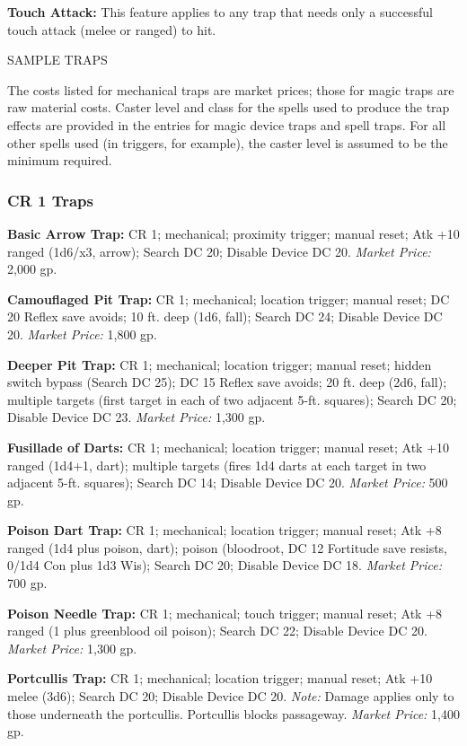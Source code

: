 \documentclass{article}
\begin{document}
\textbf{Touch Attack:} This feature applies to any trap that needs only a successful 
touch attack (melee or ranged) to hit.

\vspace{12pt}
SAMPLE TRAPS

The costs listed for mechanical traps are market prices; those for magic traps 
are raw material costs. Caster level and class for the spells used to produce the 
trap effects are provided in the entries for magic device traps and spell traps. 
For all other spells used (in triggers, for example), the caster level is assumed 
to be the minimum required.

\subsubsection*{\textbf{CR 1 Traps}}

\textbf{Basic Arrow Trap:} CR 1; mechanical; proximity trigger; manual reset; Atk 
+10 ranged (1d6/x3, arrow); Search DC 20; Disable Device DC 20. \textit{Market 
Price: }2,000 gp.

\textbf{Camouflaged Pit Trap:} CR 1; mechanical; location trigger; manual reset; 
DC 20 Reflex save avoids; 10 ft. deep (1d6, fall); Search DC 24; Disable Device 
DC 20. \textit{Market Price: }1,800 gp.

\textbf{Deeper Pit Trap: }CR 1; mechanical; location trigger; manual reset; hidden 
switch bypass (Search DC 25); DC 15 Reflex save avoids; 20 ft. deep (2d6, fall); 
multiple targets (first target in each of two adjacent 5-ft. squares); Search DC 
20; Disable Device DC 23. \textit{Market Price: }1,300 gp.

\textbf{Fusillade of Darts:} CR 1; mechanical; location trigger; manual reset; 
Atk +10 ranged (1d4+1, dart); multiple targets (fires 1d4 darts at each target 
in two adjacent 5-ft. squares); Search DC 14; Disable Device DC 20. \textit{Market 
Price: }500 gp.

\textbf{Poison Dart Trap:} CR 1; mechanical; location trigger; manual reset; Atk 
+8 ranged (1d4 plus poison, dart); poison (bloodroot, DC 12 Fortitude save resists, 
0/1d4 Con plus 1d3 Wis); Search DC 20; Disable Device DC 18. \textit{Market Price: 
}700 gp.

\textbf{Poison Needle Trap:} CR 1; mechanical; touch trigger; manual reset; Atk 
+8 ranged (1 plus greenblood oil poison); Search DC 22; Disable Device DC 20. \textit{Market 
Price: }1,300 gp.

\textbf{Portcullis Trap:} CR 1; mechanical; location trigger; manual reset; Atk 
+10 melee (3d6); Search DC 20; Disable Device DC 20. \textit{Note: }Damage applies 
only to those underneath the portcullis. Portcullis blocks passageway. \textit{Market 
Price: }1,400 gp.
\end{document}
